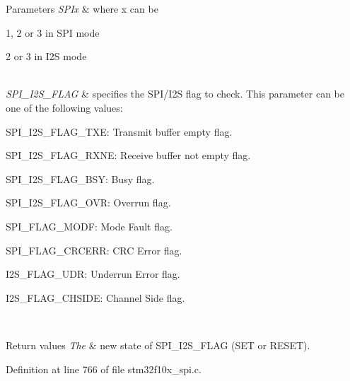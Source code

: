 \begin{DoxyParams}{Parameters}
{\em S\+P\+Ix} & where x can be
\begin{DoxyItemize}
\item 1, 2 or 3 in S\+PI mode
\item 2 or 3 in I2S mode 
\end{DoxyItemize}\\
\hline
{\em S\+P\+I\+\_\+\+I2\+S\+\_\+\+F\+L\+AG} & specifies the S\+P\+I/\+I2S flag to check. This parameter can be one of the following values\+: \begin{DoxyItemize}
\item S\+P\+I\+\_\+\+I2\+S\+\_\+\+F\+L\+A\+G\+\_\+\+T\+XE\+: Transmit buffer empty flag. \item S\+P\+I\+\_\+\+I2\+S\+\_\+\+F\+L\+A\+G\+\_\+\+R\+X\+NE\+: Receive buffer not empty flag. \item S\+P\+I\+\_\+\+I2\+S\+\_\+\+F\+L\+A\+G\+\_\+\+B\+SY\+: Busy flag. \item S\+P\+I\+\_\+\+I2\+S\+\_\+\+F\+L\+A\+G\+\_\+\+O\+VR\+: Overrun flag. \item S\+P\+I\+\_\+\+F\+L\+A\+G\+\_\+\+M\+O\+DF\+: Mode Fault flag. \item S\+P\+I\+\_\+\+F\+L\+A\+G\+\_\+\+C\+R\+C\+E\+RR\+: C\+RC Error flag. \item I2\+S\+\_\+\+F\+L\+A\+G\+\_\+\+U\+DR\+: Underrun Error flag. \item I2\+S\+\_\+\+F\+L\+A\+G\+\_\+\+C\+H\+S\+I\+DE\+: Channel Side flag. \end{DoxyItemize}
\\
\hline
\end{DoxyParams}

\begin{DoxyRetVals}{Return values}
{\em The} & new state of S\+P\+I\+\_\+\+I2\+S\+\_\+\+F\+L\+AG (S\+ET or R\+E\+S\+ET). \\
\hline
\end{DoxyRetVals}


Definition at line 766 of file stm32f10x\+\_\+spi.\+c.

